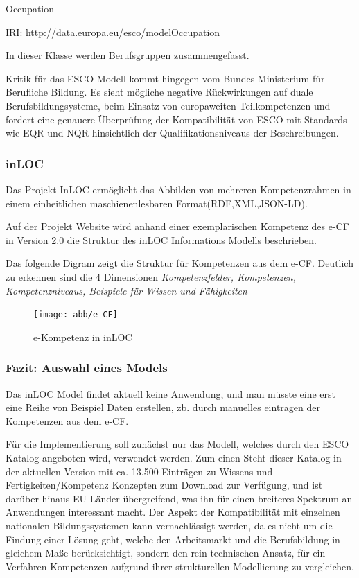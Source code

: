 Occupation 

IRI: http://data.europa.eu/esco/modelOccupation

In dieser Klasse werden Berufsgruppen zusammengefasst.

\vspace{1em}

Kritik für das ESCO Modell kommt hingegen vom Bundes Ministerium für Berufliche Bildung. Es sieht mögliche negative Rückwirkungen auf duale Berufsbildungsysteme, beim Einsatz von europaweiten Teilkompetenzen und fordert eine genauere Überprüfung der Kompatibilität von ESCO mit Standards wie EQR und NQR hinsichtlich der Qualifikationsniveaus der Beschreibungen. 

\subsubsection{inLOC}

Das Projekt InLOC ermöglicht das Abbilden von mehreren Kompetenzrahmen in einem einheitlichen maschienenlesbaren Format(RDF,XML,JSON-LD). 

Auf der Projekt Website wird anhand einer exemplarischen Kompetenz des e-CF in Version 2.0 die Struktur des inLOC Informations Modells beschrieben. 

Das folgende Digram zeigt die Struktur für Kompetenzen aus dem e-CF.
 Deutlich zu erkennen sind die 4 Dimensionen \textit{Kompetenzfelder, Kompetenzen, Kompetenzniveaus, Beispiele für Wissen und Fähigkeiten}
 
 \begin{figure}[htb]
 \centering
 \texttt{[image: abb/e-CF]}
 \caption[Beschreibung]{e-Kompetenz in inLOC}
\label{fig:e-Kompetenz in inLOC}
\end{figure}

 
 \subsubsection{Fazit: Auswahl eines Models}
 
  Das inLOC Model findet aktuell keine Anwendung, und man müsste eine erst eine Reihe von Beispiel Daten erstellen, zb. durch manuelles eintragen der Kompetenzen aus dem e-CF. 
 
 Für die Implementierung soll zunächst nur das Modell, welches durch den ESCO Katalog angeboten wird, verwendet werden. Zum einen Steht dieser Katalog in der aktuellen Version mit ca. 13.500 Einträgen zu Wissens und Fertigkeiten/Kompetenz Konzepten zum Download zur Verfügung, und ist darüber hinaus EU Länder übergreifend, was ihn für einen breiteres Spektrum an Anwendungen interessant macht. 
 Der Aspekt der Kompatibilität mit einzelnen nationalen Bildungssystemen kann vernachlässigt werden, da es nicht um die Findung einer Lösung geht, welche den Arbeitsmarkt und die Berufsbildung in gleichem Maße berücksichtigt, sondern den rein technischen Ansatz, für ein Verfahren Kompetenzen aufgrund ihrer strukturellen Modellierung zu vergleichen. 
 



